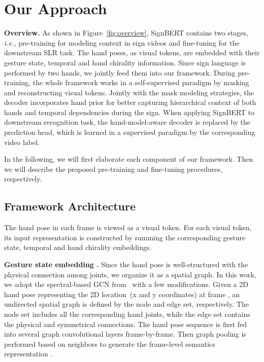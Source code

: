 \documentclass[10pt,twocolumn,letterpaper]{article}
\begin{document}
\section{Our Approach}

\noindent \textbf{Overview.}
As shown in Figure~\ref{fig:overview}, SignBERT contains two stages, \emph{i.e.,} pre-training for modeling context in sign videos and fine-tuning for the downstream SLR task.
The hand poses, as visual tokens, are embedded with their gesture state, temporal and hand chirality information.
Since sign language is performed by two hands, we jointly feed them into our framework.
During pre-training, the whole framework works in a self-supervised paradigm by masking and reconstructing visual tokens.
Jointly with the mask modeling strategies, the decoder incorporates hand prior for better capturing hierarchical context of both hands and temporal dependencies during the sign.
When applying SignBERT to downstream recognition task, the hand-model-aware decoder is replaced by the prediction head, which is learned in a supervised paradigm by the corresponding video label.

In the following, we will first elaborate each component of our framework.
Then we will describe the proposed pre-training and fine-tuning procedures, respectively.


\subsection{Framework Architecture}
The hand pose in each frame is viewed as a visual token.
For each visual token, its input representation is constructed by summing the corresponding gesture state, temporal and hand chirality embeddings.

\noindent \textbf{Gesture state embedding .}
Since the hand pose is well-structured with the physical connection among joints, we organize it as a spatial graph.
In this work, we adopt the spectral-based GCN from~\cite{cai2019exploiting, yan2018spatial} with a few modifications.
Given a 2D hand pose  representing the 2D location~(x and y coordinates) at frame , an undirected spatial graph is defined by the node  and edge  set, respectively.
The node set includes all the corresponding hand joints, while the edge set contains the physical and symmetrical connections.
The hand pose sequence is first fed into several graph convolutional layers frame-by-frame.
Then graph pooling is performed based on neighbors to generate the frame-level semantics representation .
\end{document}
